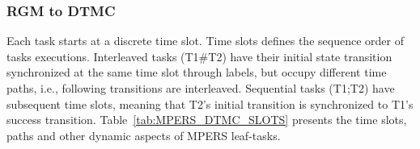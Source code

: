 \subsubsection{RGM to DTMC}

Each task starts at a discrete time slot. Time slots defines the sequence order of tasks executions. Interleaved tasks (T1\#T2) have their initial state transition synchronized at the same time slot through labels, but occupy different time paths, i.e., following transitions are interleaved. Sequential tasks (T1;T2) have subsequent time slots, meaning that T2's initial transition is synchronized to T1's success transition. Table~\ref{tab:MPERS_DTMC_SLOTS} presents the time slots, paths and other dynamic aspects of MPERS leaf-tasks.

